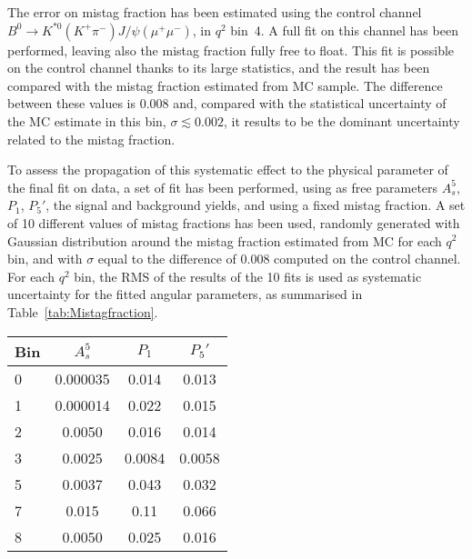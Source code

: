 The error on mistag fraction has been estimated using the control channel $B^0 \rightarrow K^{*0}(K^+\pi^-) J/\psi(\mu^+ \mu^-)$, in $q^2$ bin~4.
A full fit on this channel has been performed, leaving also the mistag fraction fully free to float.
This fit is possible on the control channel thanks to its large statistics, and the result has been compared with the mistag fraction estimated from MC sample.
The difference between these values is 0.008 and, compared with the statistical uncertainty of the MC estimate in this bin, $\sigma\lesssim0.002$, it results to be the dominant uncertainty related to the mistag fraction.

To assess the propagation of this systematic effect to the physical parameter of the final fit on data, a set of fit has been performed, using as free parameters $A_s^5$, $P_1$, $P_5'$, the signal and background yields, and using a fixed mistag fraction.
A set of 10 different values of mistag fractions has been used, randomly generated with Gaussian distribution around the mistag fraction estimated from MC for each $q^2$ bin, and with $\sigma$ equal to the difference of 0.008 computed on the control channel.
For each $q^2$ bin, the RMS of the results of the 10 fits is used as systematic uncertainty for the fitted angular parameters, as summarised in Table~\ref{tab:Mistagfraction}.

\begin{table*}[!htb]
  \begin {center}
    \caption{Systematic uncertainties: mistag fraction.\label{tab:Mistagfraction}}
    \begin{tabular}{l|c|c|c}
      Bin & $A_s^5$  & $P_1$ & $P_5'$  \\
      \hline
      \hline
      0  & 0.000035 & 0.014  &  0.013 \\
      1  & 0.000014 & 0.022  &  0.015 \\
      2  & 0.0050   & 0.016  &  0.014 \\ 
      3  & 0.0025   & 0.0084 &  0.0058\\ 
      5  & 0.0037   & 0.043  &  0.032  \\ 
      7  & 0.015    & 0.11   &  0.066 \\
      8  & 0.0050   & 0.025  &  0.016 \\
    \end{tabular}

  \end{center}
\end{table*}

